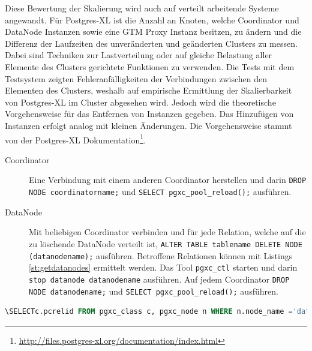 Diese Bewertung der Skalierung wird auch auf verteilt arbeitende Systeme angewandt.
Für Postgres-XL ist die Anzahl an Knoten, welche Coordinator und DataNode Instanzen sowie eine GTM Proxy Instanz besitzen, zu ändern und die Differenz der Laufzeiten des unveränderten und geänderten Clusters zu messen.
Dabei sind Techniken zur Lastverteilung oder auf gleiche Belastung aller Elemente des Clusters gerichtete Funktionen zu verwenden.
Die Tests mit dem Testsystem zeigten Fehleranfälligkeiten der Verbindungen zwischen den Elementen des Clusters, weshalb auf empirische Ermittlung der Skalierbarkeit von Postgres-XL im Cluster abgesehen wird.
Jedoch wird die theoretische Vorgehensweise für das Entfernen von Instanzen gegeben.
Das Hinzufügen von Instanzen erfolgt analog mit kleinen Änderungen.
Die Vorgehensweise stammt von der Postgres-XL Dokumentation\footnote{\url{http://files.postgres-xl.org/documentation/index.html}}.
\begin{description}
\item[Coordinator] Eine Verbindung mit einem anderen Coordinator herstellen und darin \verb+DROP NODE coordinatorname;+ und \verb+SELECT pgxc_pool_reload();+ ausführen.
\item[DataNode] Mit beliebigen Coordinator verbinden und für jede Relation, welche auf die zu löschende DataNode verteilt ist, \verb+ALTER TABLE tablename DELETE NODE+\\\verb+(datanodename);+ ausführen. Betroffene Relationen können mit Listings \ref{st:getdatanodes} ermittelt werden. Das Tool \verb+pgxc_ctl+ starten und darin \verb+stop datanode datanodename+ ausführen. Auf jedem Coordinator \verb+DROP NODE datanodename;+ und \verb+SELECT pgxc_pool_reload();+ ausführen.
\end{description}
\begin{lstlisting}[language=sql,caption={SQL Query zur Ermittlung betroffener DataNodes ausgewählter Relationen},label=lst:getdatanodes]
\SELECTc.pcrelid FROM pgxc_class c, pgxc_node n WHERE n.node_name ='datanodename' AND n.oid = ANY (c.nodeoids);
\end{lstlisting}

